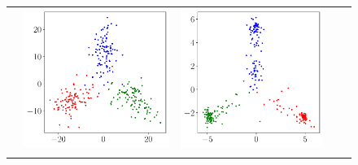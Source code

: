 \begin{figure}[ht]
{\begin{tabular}{m{.03\linewidth}*4{C}@{}}
            & \includegraphics[width=\linewidth]{figures/resnet_penultimate_plot_0.pdf} 
            & \includegraphics[width=\linewidth]{figures/resnet_penultimate_plot_2.pdf}\\ 

\end{tabular}}
\end{figure}
